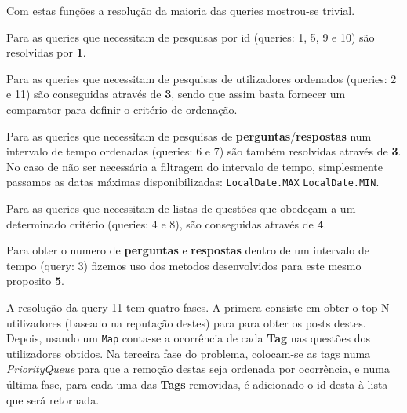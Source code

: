\documentclass[10pt,a4paper]{report}
\begin{document}
    Com estas funções a resolução da maioria das queries mostrou-se
    trivial.

    Para as queries que necessitam de pesquisas por id (queries: 1, 5, 9 e 10)
    são resolvidas por \textbf{1}.

    Para as queries que necessitam de pesquisas de utilizadores ordenados
    (queries: 2 e 11) são conseguidas através de \textbf{3}, sendo que assim
    basta fornecer um comparator para definir o critério de ordenação.

    Para as queries que necessitam de pesquisas de
    \textbf{perguntas}/\textbf{respostas} num intervalo de tempo ordenadas
    (queries: 6 e 7) são também resolvidas através de \textbf{3}. No caso de não
    ser necessária a filtragem do intervalo de tempo, simplesmente passamos as
    datas máximas disponibilizadas: \texttt{LocalDate.MAX}
    \texttt{LocalDate.MIN}.

    Para as queries que necessitam de listas de questões que obedeçam a um
    determinado critério (queries: 4 e 8), são conseguidas através de
    \textbf{4}.

    Para obter o numero de \textbf{perguntas} e \textbf{respostas} dentro
    de um intervalo de tempo (query: 3) fizemos uso dos metodos desenvolvidos
    para este mesmo proposito \textbf{5}.

    A resolução da query 11 tem quatro fases. A primera consiste em obter o top
    N utilizadores (baseado na reputação destes) para para obter os posts
    destes.
    Depois, usando um \texttt{Map} conta-se a ocorrência de cada
    \textbf{Tag} nas questões dos utilizadores obtidos. Na terceira fase do
    problema, colocam-se as tags numa \textit{PriorityQueue} para que a
    remoção destas seja ordenada por ocorrência, e numa última fase, para cada
    uma das \textbf{Tags} removidas, é adicionado o id desta à lista que será
    retornada.
\end{document}
